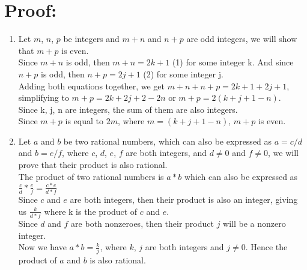 \documentclass[11pt]{article}
\begin{document}
\section{Proof:}
\begin{enumerate}
    \item Let $m$, $n$, $p$ be integers and $m + n$ and $n + p$ are odd integers, we will show that $m + p$ is even. \\
    Since $m + n$ is odd, then $m + n = 2k + 1$ (1) for some integer k. And since $n + p$ is odd, then $n + p = 2j + 1$ (2) for some integer j. \\
    Adding both equations together, we get $m + n + n + p = 2k + 1 + 2j + 1$, simplifying to $m + p = 2k + 2j + 2 - 2n$ or $m + p = 2(k + j + 1 - n)$. \\
    Since k, j, n are integers, the sum of them are also integers. \\
    Since $m + p$ is equal to $2m$, where $m = (k + j + 1 - n)$, $m + p$ is even. \\

    \item Let $a$ and $b$ be two rational numbers, which can also be expressed as $a = c/d$ and $b = e/f$, where $c$, $d$, $e$, $f$ are both integers, and $d \neq 0$ and $f \neq 0$, we will prove that their product is also rational. \\
    The product of two rational numbers is $a * b$ which can also be expressed as $\frac{c}{d} * \frac{e}{f} = \frac{c * e}{d * f}$ \\
    Since $c$ and $e$ are both integers, then their product is also an integer, giving us $\frac{k}{d * f}$ where k is the product of $c$ and $e$. \\
    Since $d$ and $f$ are both nonzeroes, then their product $j$ will be a nonzero integer.\\
    Now we have $a * b = \frac{k}{j}$, where $k$, $j$ are both integers and $j \neq 0$. Hence the product of $a$ and $b$ is also rational.

   
\end{enumerate}
\end{document}
